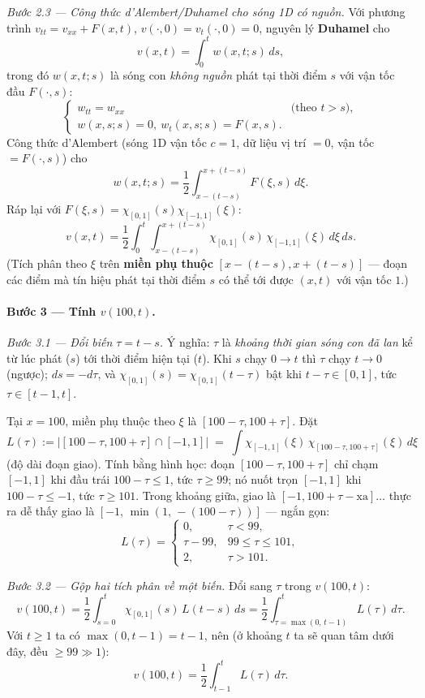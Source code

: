 \emph{Bước 2.3 --- Công thức d'Alembert/Duhamel cho sóng 1D có nguồn.} Với phương trình $v_{tt}=v_{xx}+F(x,t)$, $v(\cdot,0)=v_t(\cdot,0)=0$, nguyên lý \textbf{Duhamel} cho
\[
  v(x,t)=\int_0^t w(x,t;s)\,ds,
\]
trong đó $w(x,t;s)$ là sóng con \emph{không nguồn} phát tại thời điểm $s$ với vận tốc đầu $F(\cdot,s)$:
\[
  \begin{cases} w_{tt}=w_{xx}&\text{(theo }t>s\text{)},\\ w(x,s;s)=0,\ w_t(x,s;s)=F(x,s).\end{cases}
\]
Công thức d'Alembert (sóng 1D vận tốc $c=1$, dữ liệu vị trí $=0$, vận tốc $=F(\cdot,s)$) cho
\[
  w(x,t;s)=\frac12\int_{x-(t-s)}^{x+(t-s)} F(\xi,s)\,d\xi.
\]
Ráp lại với $F(\xi,s)=\chi_{[0,1]}(s)\chi_{[-1,1]}(\xi)$:
\[
  v(x,t)=\frac12\int_0^t\!\!\int_{x-(t-s)}^{x+(t-s)} \chi_{[0,1]}(s)\,\chi_{[-1,1]}(\xi)\,d\xi\,ds.
\]
(Tích phân theo $\xi$ trên \textbf{miền phụ thuộc} $[x-(t-s),x+(t-s)]$ --- đoạn các điểm mà tín hiệu phát tại thời điểm $s$ có thể tới được $(x,t)$ với vận tốc $1$.)

\paragraph{Bước 3 --- Tính $v(100,t)$.}\leavevmode

\emph{Bước 3.1 --- Đổi biến $\tau=t-s$.} Ý nghĩa: $\tau$ là \emph{khoảng thời gian sóng con đã lan} kể từ lúc phát ($s$) tới thời điểm hiện tại ($t$). Khi $s$ chạy $0\to t$ thì $\tau$ chạy $t\to 0$ (ngược); $ds=-d\tau$, và $\chi_{[0,1]}(s)=\chi_{[0,1]}(t-\tau)$ bật khi $t-\tau\in[0,1]$, tức $\tau\in[t-1,t]$.

Tại $x=100$, miền phụ thuộc theo $\xi$ là $[100-\tau,100+\tau]$. Đặt
\[
  L(\tau):=\big|[100-\tau,100+\tau]\cap[-1,1]\big|\;=\;\int \chi_{[-1,1]}(\xi)\,\chi_{[100-\tau,100+\tau]}(\xi)\,d\xi
\]
(độ dài đoạn giao). Tính bằng hình học: đoạn $[100-\tau,100+\tau]$ chỉ chạm $[-1,1]$ khi đầu trái $100-\tau\le 1$, tức $\tau\ge 99$; nó nuốt trọn $[-1,1]$ khi $100-\tau\le -1$, tức $\tau\ge 101$. Trong khoảng giữa, giao là $[-1,100+\tau\!-\!\text{xa}]\dots$ thực ra dễ thấy giao là $[-1,\,\min(1,\,-(100-\tau))]$ --- ngắn gọn:
\[
  L(\tau)=\begin{cases}
    0,& \tau<99,\\
    \tau-99,& 99\le\tau\le 101,\\
    2,& \tau>101.
  \end{cases}
\]

\emph{Bước 3.2 --- Gộp hai tích phân về một biến.} Đổi sang $\tau$ trong $v(100,t)$:
\[
  v(100,t)=\frac12\int_{s=0}^{t}\chi_{[0,1]}(s)\,L(t-s)\,ds
          =\frac12\int_{\tau=\max(0,\,t-1)}^{t} L(\tau)\,d\tau.
\]
Với $t\ge 1$ ta có $\max(0,t-1)=t-1$, nên (ở khoảng $t$ ta sẽ quan tâm dưới đây, đều $\ge 99\gg 1$):
\[
  v(100,t)=\frac12\int_{t-1}^{t} L(\tau)\,d\tau.
\]

